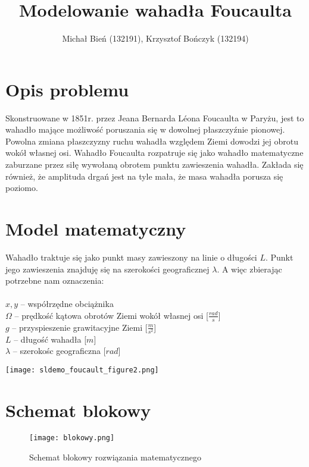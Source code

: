 \documentclass[a4paper]{article}
\author{Michał Bień (132191), Krzysztof Bończyk (132194)}
\title{Modelowanie wahadła Foucaulta}
\date{}
\begin{document}
\maketitle
\section{Opis problemu}
Skonstruowane w 1851r. przez Jeana Bernarda Léona Foucaulta w Paryżu, jest to wahadło mające możliwość poruszania się w dowolnej płaszczyźnie pionowej. Powolna zmiana płaszczyzny ruchu wahadła względem Ziemi dowodzi jej obrotu wokół własnej osi. Wahadło Foucaulta rozpatruje się jako wahadło matematyczne zaburzane przez siłę wywołaną obrotem punktu zawieszenia wahadła. Zakłada się również, że amplituda drgań jest na tyle mała, że masa wahadła porusza się poziomo.

\section{Model matematyczny}
Wahadło traktuje się jako punkt masy zawieszony na linie o długości $L$. Punkt jego zawieszenia znajduję się na szerokości geograficznej $\lambda$. A więc zbierając potrzebne nam oznaczenia:\\
\\
$x,y$ -- współrzędne obciążnika \\
$\Omega$ -- prędkość kątowa obrotów Ziemi wokół własnej osi [$\frac{rad}{s}$]\\
$g$ -- przyspieszenie grawitacyjne Ziemi [$\frac{m}{s^2}$]\\
$L$ -- długość wahadła [$m$]\\
$\lambda$ -- szerokośc geograficzna [$rad$]\\

\begin{center}
\texttt{[image: sldemo\_foucault\_figure2.png]}
\end{center}

\newpage
\section{Schemat blokowy}
\begin{figure}[h]
\begin{center}
\texttt{[image: blokowy.png]}
\end{center}
\caption{Schemat blokowy rozwiązania matematycznego\cite{matlab}}
\end{figure}
\end{document}
